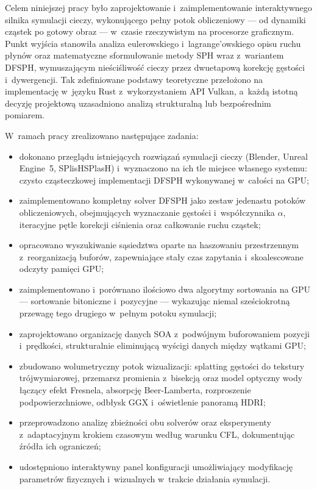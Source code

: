 Celem niniejszej pracy było zaprojektowanie i~zaimplementowanie interaktywnego
silnika symulacji cieczy, wykonującego pełny potok obliczeniowy --- od dynamiki
cząstek po gotowy obraz --- w~czasie rzeczywistym na procesorze graficznym.
Punkt wyjścia stanowiła analiza eulerowskiego i~lagrange'owskiego opisu ruchu
płynów oraz matematyczne sformułowanie metody SPH wraz z~wariantem DFSPH,
wymuszającym nieściśliwość cieczy przez dwuetapową korekcję gęstości
i~dywergencji. Tak zdefiniowane podstawy teoretyczne przełożono na implementację
w~języku Rust z~wykorzystaniem API Vulkan, a~każdą istotną decyzję projektową
uzasadniono analizą strukturalną lub bezpośrednim pomiarem.

W~ramach pracy zrealizowano następujące zadania:
\begin{itemize}
    \item dokonano przeglądu istniejących rozwiązań symulacji cieczy
          (Blender, Unreal Engine~5, SPlisHSPlasH) i~wyznaczono na ich tle
          miejsce własnego systemu: czysto cząsteczkowej implementacji DFSPH
          wykonywanej w~całości na GPU;
    \item zaimplementowano kompletny solver DFSPH jako zestaw jedenastu potoków
          obliczeniowych, obejmujących wyznaczanie gęstości i~współczynnika
          $\alpha$, iteracyjne pętle korekcji ciśnienia oraz całkowanie ruchu
          cząstek;
    \item opracowano wyszukiwanie sąsiedztwa oparte na haszowaniu przestrzennym
          z~reorganizacją buforów, zapewniające stały czas zapytania
          i~skoalescowane odczyty pamięci GPU;
    \item zaimplementowano i~porównano ilościowo dwa algorytmy sortowania
          na GPU --- sortowanie bitoniczne i~pozycyjne --- wykazując niemal
          sześciokrotną przewagę tego drugiego w~pełnym potoku symulacji;
    \item zaprojektowano organizację danych SOA z~podwójnym buforowaniem pozycji
          i~prędkości, strukturalnie eliminującą wyścigi danych między wątkami
          GPU;
    \item zbudowano wolumetryczny potok wizualizacji: splatting gęstości
          do tekstury trójwymiarowej, przemarsz promienia z~bisekcją oraz model
          optyczny wody łączący efekt Fresnela, absorpcję Beer-Lamberta,
          rozproszenie podpowierzchniowe, odbłysk GGX i~oświetlenie panoramą
          HDRI;
    \item przeprowadzono analizę zbieżności obu solverów oraz eksperymenty
          z~adaptacyjnym krokiem czasowym według warunku CFL, dokumentując
          źródła ich ograniczeń;
    \item udostępniono interaktywny panel konfiguracji umożliwiający modyfikację
          parametrów fizycznych i~wizualnych w~trakcie działania symulacji.
\end{itemize}

